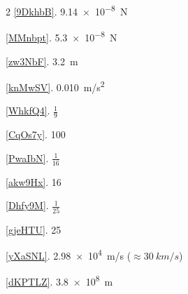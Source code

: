 \documentclass[dvipsnames]{article}
\numberwithin{equation}{section}
\numberwithin{figure}{section}
\begin{document}
\begin{multicols}{2}
\ref{9DkhbB}. \SI{9.14e-8}{N}

\ref{MMnbpt}. \SI{5.3e-8}{N}

\ref{zw3NbF}. \SI{3.2}{m}

\ref{knMwSV}. \SI{0.010}{m/s^2}

\ref{WhkfQ4}. $\frac{1}{9}$

\ref{CqOs7y}. 100

\ref{PwaIbN}. $\frac{1}{16}$

\ref{akw9Hx}. 16

\ref{Dhfy9M}. $\frac{1}{25}$

\ref{gjeHTU}. 25

\ref{yXaSNL}. \SI{2.98e4}{m/s} ($\approx \SI{30}{km/s}$)

\ref{dKPTLZ}. \SI{3.8e8}{m}

\end{multicols}
\end{document}
